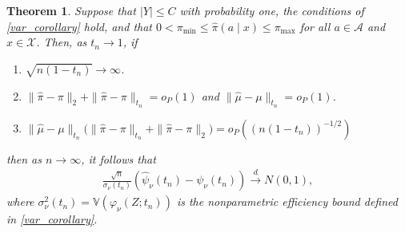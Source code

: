 \documentclass[10pt,a4paper]{amsart}
\newtheorem{theorem}{Theorem}
\begin{document}
\begin{theorem} \label{wasserstein_asymptotics}
    Suppose that $|Y| \leq C$ with probability one, the conditions of \cref{var_corollary} hold, and that $0 < \pi_{\min} \leq \widehat{\pi}(a \! \mid \! x) \leq \pi_{\max}$ for all $a \in \mathcal{A}$ and $x \in \mathcal{X}$. Then, as $t_n \to 1$, if
    \begin{enumerate}
        \item[$(i)$] $\sqrt{n(1-t_n)} \to \infty$.
        \item[$(ii)$]  $ \|\widehat{\pi} - \pi\|_2 + \|\widehat{\pi} - \pi\|_{t_n} = o_{P}(1)$ and  $\| \widehat{\mu} - \mu \|_{t_n} =  o_{P}(1)$.
        \item[$(iii)$] $ \| \widehat{\mu} - \mu \|_{t_n} \Big( \|\widehat{\pi} - \pi\|_{t_n} + \|\widehat{\pi} - \pi\|_2 \Big)   = o_{P}\left((n(1-t_n))^{-1/2}\right)$
    \end{enumerate}
    then as $n \to \infty$, it follows that
    \begin{align*}
        \frac{\sqrt{n}}{\sigma_\nu(t_n)}\left(\widehat{\psi}_\nu(t_n) - \psi_\nu(t_n) \right)\overset{d}{\longrightarrow}N(0,1),
    \end{align*}
where $\sigma^2_\nu(t_n) = \mathbb{V}(\varphi_\nu(Z;t_n))$ is the nonparametric efficiency bound defined in \cref{var_corollary}. 
\end{theorem}
\end{document}
